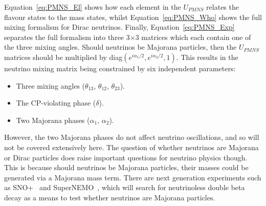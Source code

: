 Equation~\ref{eq:PMNS_El} shows how each element in the $U_{PMNS}$ relates the flavour states to the mass states, whilst Equation~\ref{eq:PMNS_Who} shows the full mixing formalism for Dirac neutrinos. Finally, Equation~\ref{eq:PMNS_Exp} separates the full formalism into three 3$\times$3 matrices which each contain one of the three mixing angles. Should neutrinos be Majorana particles, then the $U_{PMNS}$ matrices should be multiplied by diag$\left(e^{i\alpha_1/2}, e^{i\alpha_2/2}, 1\right)$. This results in the neutrino mixing matrix being constrained by six independent parameters:
\begin{itemize}
 \item Three mixing angles ($\theta_{13}$, $\theta_{12}$, $\theta_{23}$).
 \item The CP-violating phase ($\delta$).
 \item Two Majorana phases ($\alpha_1$, $\alpha_2$).
\end{itemize}
However, the two Majorana phases do not affect neutrino oscillations, and so will not be covered extensively here. The question of whether neutrinos are Majorana or Dirac particles does raise important questions for neutrino physics though. This is because should neutrinos be Majorana particles, their masses could be generated via a Majorana mass term. There are next generation experiments such as SNO+~\citep{SNO+} and SuperNEMO~\citep{SuperNEMO}, which will search for neutrinoless double beta decay as a means to test whether neutrinos are Majorana particles. \\

